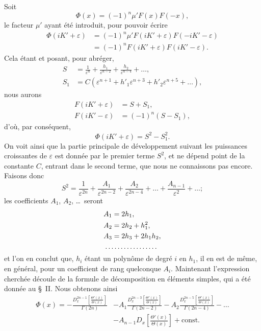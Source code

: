 \documentclass[11pt,leqno,oneside,letterpaper]{book}[2005/09/16]
\newcommand{\dotfillalign}{\multispan{2}{\dotfill}}
\begin{document}
Soit
\[
\Phi(x) = (-1)^n \mu' F(x) F(-x),
\]
le facteur $\mu'$ ayant \'et\'e introduit, pour pouvoir \'ecrire
\begin{align*}
\Phi(iK' + \varepsilon) &= (-1)^n \mu' F(iK' + \varepsilon) F(-iK'-\varepsilon) \\
                        &= (-1)^n      F(iK' + \varepsilon) F( iK'-\varepsilon).
\end{align*}
Cela \'etant et posant, pour abr\'eger,
\begin{align*}
S   &= \frac{1}{\varepsilon^n} + \frac{h_1}{\varepsilon^{n-2}} +
  \frac{h_2}{\varepsilon^{n-4}} + \ldots,\\
S_1 &= C \left(\varepsilon^{n+1} + h'_1 \varepsilon^{n+3} +
  h'_2 \varepsilon^{n+5} + \ldots\right),
\end{align*}
nous aurons
\begin{align*}
F(iK' + \varepsilon) &= S + S_1, \\
F(iK' - \varepsilon) &= (-1)^n (S - S_1),
\end{align*}
d'o\`u, par cons\'equent,
\[
\Phi(iK' + \varepsilon) = S^2 - S_1^2.
\]
On voit ainsi que la partie principale de d\'eveloppement suivant les puissances
croissantes de $\varepsilon$ est donn\'ee par le premier terme $S^2$, et ne d\'epend
point de la constante $C$, entrant dans le second terme, que nous ne connaissons
pas encore. Faisons donc
\[
S^2 = \frac{1}{\varepsilon^{2n}}
    + \frac{A_1}{\varepsilon^{2n-2}}
    + \frac{A_2}{\varepsilon^{2n-4}} + \ldots
    + \frac{A_{n-1}}{\varepsilon^2} + \ldots;
\]
les coefficients $A_1$, $A_2$, \ldots\ seront
\begin{align*}
A_1 &= 2h_1, \\
A_2 &= 2h_2 + h^2_1, \\
A_3 &= 2h_3 + 2h_1h_2, \\
\dotfillalign
\end{align*}
et l'on en conclut que, $h_i$ \'etant un polyn\^ome de degr\'e $i$ en $h_1$, il en est de
m\^eme, en g\'en\'eral, pour un coefficient de rang quelconque $A_i$. Maintenant
l'expression cherch\'ee d\'ecoule de la formule de d\'ecomposition en \'el\'ements
simples, qui a \'et\'e donn\'ee au \S~II. Nous obtenons ainsi
\begin{align*}
\Phi(x) = -   \frac{D_x^{2n-1} \left[ \frac{\Theta'(x)}{\Theta(x)} \right]}{\Gamma(2n)}
    &-A_1\frac{D_x^{2n-3}   \left[ \frac{\Theta'(x)}{\Theta(x)} \right]}{\Gamma(2n-2)}
     -A_2\frac{D_x^{2n-5}   \left[ \frac{\Theta'(x)}{\Theta(x)} \right]}{\Gamma(2n-4)} -\ldots \\
    &-A_{n-1} D_x         \left[ \frac{\Theta'(x)}{\Theta(x)} \right] + \textrm{const.}
\end{align*}
\end{document}
